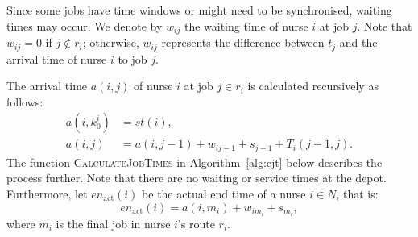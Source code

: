 \documentclass[a4paper,11pt,authoryear]{elsarticle}
\begin{document}
Since some jobs have time windows or might need to be synchronised, waiting times may occur. We denote by $w_{ij}$ the waiting time of nurse $i$ at job $j$. Note that $w_{ij} = 0$ if $j \notin r_i$; otherwise, $w_{ij}$ represents the difference between $t_j$ and the arrival time of nurse $i$ to job $j$.%



The arrival time $a(i,j)$ of nurse $i$ at job $j \in r_i$ is calculated recursively as follows:
\begin{subequations}
	\begin{align}
		a(i,k_0^i) &= st(i), \label{eq:recursionarrivalbase}\\[3pt]
		a(i,j) &= a(i,j-1) + w_{ij-1} + s_{j-1} + T_i(j-1, j). \label{eq:arrivaltime}
	\end{align}
\end{subequations}
The function \textsc{CalculateJobTimes} in Algorithm~\ref{alg:cjt} below describes the process further. Note that there are no waiting or service times at the depot. Furthermore, let $en_{\text{act}}(i)$ be the actual end time of a nurse $i \in N$, that is:
\begin{equation}
	en_{\text{act}}(i) = a(i,m_i) + w_{im_i} + s_{m_i}, \label{eq:actualendtime}
\end{equation}
where $m_i$ is the final job in nurse $i$'s route $r_i$.

\end{document}
